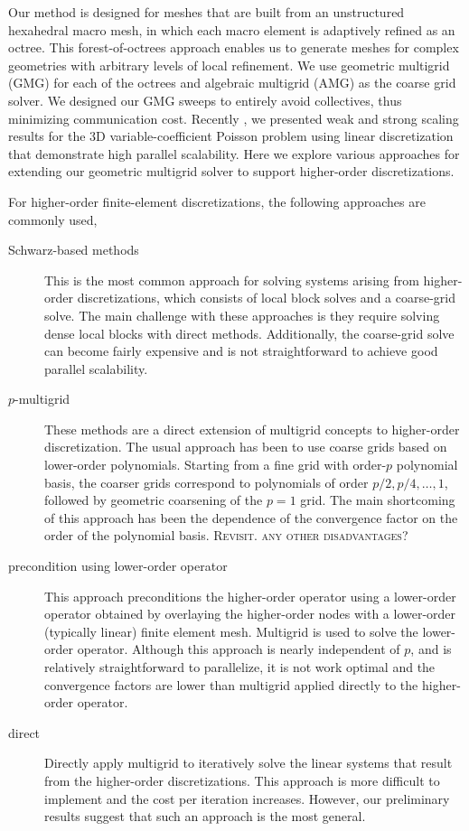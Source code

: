 \documentclass[times]{nlaauth}
\begin{document}
 Our method is designed for meshes that are built from an unstructured
hexahedral macro mesh, in which each macro element is adaptively
refined as an octree. This forest-of-octrees approach enables us to
generate meshes for complex geometries with arbitrary levels of local
refinement. We use geometric multigrid (GMG) for each of the octrees
and algebraic multigrid (AMG) as the coarse grid solver. We designed
our GMG sweeps to entirely avoid collectives, thus minimizing
communication cost. Recently \cite{sundar12}, we presented weak and strong scaling
results for the 3D variable-coefficient Poisson problem using linear
discretization that demonstrate high parallel scalability. Here we
explore various approaches for extending our geometric multigrid
solver to support higher-order discretizations.

For higher-order finite-element discretizations, the following approaches are commonly used, 
\begin{description}

	\item[Schwarz-based methods] This is the most common approach for
	solving systems arising from higher-order discretizations, which
	consists of local block solves and a coarse-grid solve. The main
	challenge with these approaches is they require solving dense local
	blocks with direct methods. Additionally, the coarse-grid solve can
	become fairly expensive and is not straightforward to achieve good
	parallel scalability. 

 \item[$p$-multigrid] These methods are a direct extension of
	multigrid concepts to higher-order discretization. The usual
	approach has been to use coarse grids based on lower-order
	polynomials. Starting from a fine grid with order-$p$ polynomial
	basis, the coarser grids correspond to polynomials of order $p/2,
	p/4,\ldots,1$, followed by geometric coarsening of the $p=1$
	grid. The main shortcoming of this approach has been the dependence
	of the convergence factor on the order of the polynomial
	basis. \textsc{Revisit. any other disadvantages}?

\item[precondition using lower-order operator] This
	approach preconditions the higher-order operator using a lower-order
	operator obtained by overlaying the higher-order nodes with a
	lower-order (typically linear) finite element mesh. Multigrid is
	used to solve the lower-order operator. Although this approach is
	nearly independent of $p$, and is relatively straightforward to
	parallelize, it is not work optimal and the convergence factors are
	lower than multigrid applied directly to the higher-order
	operator.  

\item[direct] Directly apply multigrid to iteratively
	solve the linear systems that result from the higher-order
	discretizations. This approach is more difficult to implement and
	the cost per iteration increases. However, our preliminary results
	suggest that such an approach is the most general.
\end{description} 
\end{document}
